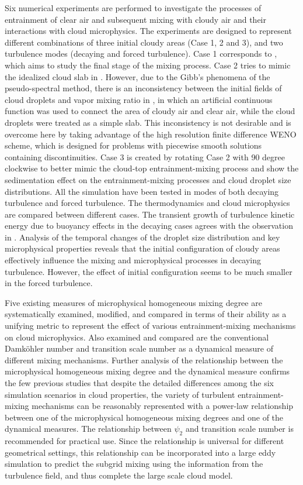 \documentclass[draft,linenumbers]{agujournal}
\begin{document}
Six numerical experiments are performed to investigate the processes of entrainment of clear air and subsequent mixing with cloudy air and their interactions with cloud microphysics. The experiments are designed to represent different combinations of three initial cloudy areas (Case 1, 2 and 3), and two turbulence modes (decaying and forced turbulence). Case 1 corresponds to \citet{And04}, which aims to study the final stage of the mixing process. Case 2 tries to mimic the idealized cloud slab in \citet{Kumar12}. However, due to the Gibb's phenomena of the pseudo-spectral method, there is an inconsistency between the initial fields of cloud droplets and vapor mixing ratio in \citet{Kumar12}, in which an artificial continuous function was used to connect the area of cloudy air and clear air, while the cloud droplets were treated as a simple slab. This inconsistency is not desirable and is overcome here by taking advantage of the high resolution finite difference WENO scheme, which is designed for problems with piecewise smooth solutions containing discontinuities. Case 3 is created by rotating Case 2 with 90 degree clockwise to better mimic the cloud-top entrainment-mixing process and show the sedimentation effect on the entrainment-mixing processes and cloud droplet size distributions. All the simulation have been tested in modes of both decaying turbulence and forced turbulence. The thermodynamics and cloud microphysics are compared between different cases. The transient growth of turbulence kinetic energy due to buoyancy effects in the decaying cases agrees with the observation in \citet{Kumar14}. Analysis of the temporal changes of the droplet size distribution and key microphysical properties reveals that the initial configuration of cloudy areas effectively influence the mixing and microphysical processes in decaying turbulence. However, the effect of initial configuration seems to be much smaller in the forced turbulence. 

Five existing measures of microphysical homogeneous mixing degree are systematically examined, modified, and compared in terms of their ability as a unifying metric to represent the effect of various entrainment-mixing mechanisms on cloud microphysics. Also examined and compared are the conventional Damk\"{o}hler number and transition scale number as a dynamical measure of different mixing mechanisms. Further analysis of the relationship between the microphysical homogeneous mixing degree and the dynamical measure confirms the few previous studies \citep{And09,Lu2013a,Lu2014} that despite the detailed differences among the six simulation scenarios in cloud properties, the variety of turbulent entrainment-mixing mechanisms can be reasonably represented with a power-law relationship between one of the microphysical homogeneous mixing degrees and one of the dynamical measures. The relationship between $\psi_2$ and transition scale number is recommended  for practical use. {\color{green} Since the relationship is universal for different geometrical settings, this relationship can be incorporated into a large eddy simulation to predict the subgrid mixing using the information from the turbulence field, and thus complete the large scale cloud model.} 
\end{document}
